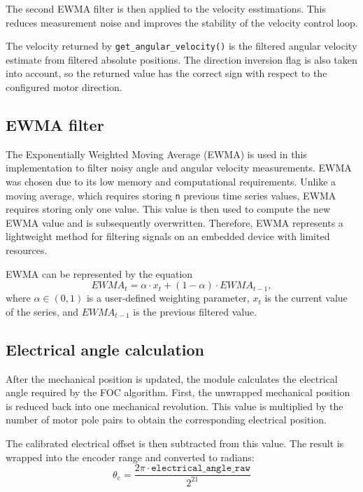 The second EWMA filter is then applied to the velocity esstimations. 
This reduces measurement noise and improves the stability of the velocity control loop.

The velocity returned by \texttt{get\_angular\_velocity()} is the filtered angular velocity estimate from filtered absolute positions. 
The direction inversion flag is also taken into account, so the returned value has the correct sign with respect to the 
configured motor direction.


\subsection{EWMA filter}

The Exponentially Weighted Moving Average (EWMA) is used in this implementation to filter noisy angle and angular velocity measurements.
EWMA was chosen due to its low memory and computational requirements. Unlike a moving average, which requires storing \texttt{n} previous
time series values, EWMA requires storing only one value. This value is then used to compute the new EWMA value and is subsequently overwritten.
Therefore, EWMA represents a lightweight method for filtering signals on an embedded device with limited resources.

EWMA can be represented by the equation
\begin{equation}
    EWMA_t = \alpha \cdot x_t + (1-\alpha) \cdot EWMA_{t-1},
\end{equation}
where $\alpha \in (0,1)$ is a user-defined weighting parameter, $x_t$ is the current value of the series, 
and $EWMA_{t-1}$ is the previous filtered value. \cite{ewma}



\subsection{Electrical angle calculation}
After the mechanical position is updated, the module calculates the electrical angle required by the FOC algorithm. 
First, the unwrapped mechanical position is reduced back into one mechanical revolution. 
This value is multiplied by the number of motor pole pairs to obtain the corresponding electrical position.

The calibrated electrical offset is then subtracted from this value. 
The result is wrapped into the encoder range and converted to radians:
\begin{equation}
    \theta_e = \frac{2\pi \cdot \texttt{electrical\_angle\_raw}}{2^{21}}
\end{equation}

